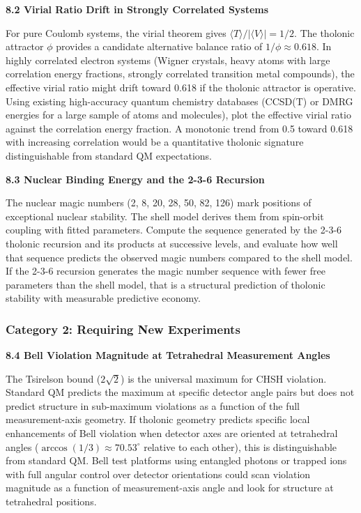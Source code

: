 \documentclass[12pt]{article}
\begin{document}
\textbf{8.2 Virial Ratio Drift in Strongly Correlated Systems}

For pure Coulomb systems, the virial theorem gives
\(\langle T \rangle / |\langle V \rangle| = 1/2\). The tholonic
attractor \(\phi\) provides a candidate alternative balance ratio of
\(1/\phi \approx 0.618\). In highly correlated electron systems (Wigner
crystals, heavy atoms with large correlation energy fractions, strongly
correlated transition metal compounds), the effective virial ratio might
drift toward 0.618 if the tholonic attractor is operative. Using
existing high-accuracy quantum chemistry databases (CCSD(T) or DMRG
energies for a large sample of atoms and molecules), plot the effective
virial ratio against the correlation energy fraction. A monotonic trend
from 0.5 toward 0.618 with increasing correlation would be a
quantitative tholonic signature distinguishable from standard QM
expectations.

\textbf{8.3 Nuclear Binding Energy and the 2-3-6 Recursion}

The nuclear magic numbers (2, 8, 20, 28, 50, 82, 126) mark positions of
exceptional nuclear stability. The shell model derives them from
spin-orbit coupling with fitted parameters. Compute the sequence
generated by the 2-3-6 tholonic recursion and its products at successive
levels, and evaluate how well that sequence predicts the observed magic
numbers compared to the shell model. If the 2-3-6 recursion generates
the magic number sequence with fewer free parameters than the shell
model, that is a structural prediction of tholonic stability with
measurable predictive economy.

\subsubsection{Category 2: Requiring New
Experiments}\label{category-2-requiring-new-experiments}

\textbf{8.4 Bell Violation Magnitude at Tetrahedral Measurement Angles}

The Tsirelson bound (\(2\sqrt{2}\)) is the universal maximum for CHSH
violation. Standard QM predicts the maximum at specific detector angle
pairs but does not predict structure in sub-maximum violations as a
function of the full measurement-axis geometry. If tholonic geometry
predicts specific local enhancements of Bell violation when detector
axes are oriented at tetrahedral angles (\(\arccos(1/3) \approx 70.53^\circ\)
relative to each other), this is distinguishable from standard QM. Bell
test platforms using entangled photons or trapped ions with full angular
control over detector orientations could scan violation magnitude as a
function of measurement-axis angle and look for structure at tetrahedral
positions.
\end{document}
